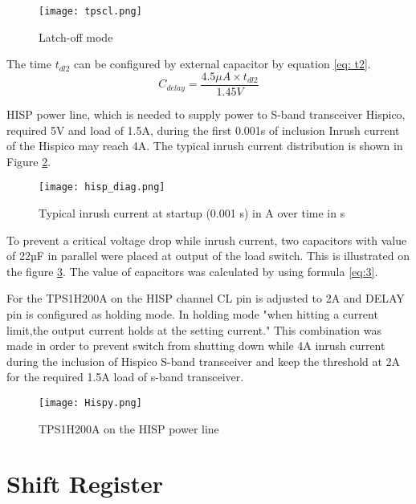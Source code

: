 \begin{figure}[h]
	\centering
	\texttt{[image: tpscl.png]}
	\caption{Latch-off mode\cite{28}}
	\label{fig: tpscl}
\end{figure} 

The time $t_{dl2}$ can be configured by external capacitor by equation \ref{eq: t2}.  \\

\begin{equation} \label{eq: t2}
C_{delay} = \frac{4.5\mu A \times t_{dl2}}{1.45V} 
\end{equation}



 HISP power line, which is needed to supply power to S-band transceiver Hispico, required 5V and load of 1.5A, during the first 0.001s of inclusion Inrush current of the Hispico may reach 4A. The typical inrush current distribution is shown in Figure \ref{fig: hisp_inr}.

\begin{figure}[h]
	\centering
	\texttt{[image: hisp\_diag.png]}
	\caption{Typical inrush current at startup (0.001 s) in A over time in s}
	\label{fig: hisp_inr}
\end{figure} 

To prevent a critical voltage drop while inrush current, two capacitors with value of 22µF in parallel were placed at output of the load switch. This is illustrated on the figure \ref{fig: hispico}. The value of capacitors was calculated by using formula \ref{eq:3}.

For the TPS1H200A on the HISP channel CL pin is adjusted to 2A and DELAY pin is configured as holding mode. In holding mode \cite{28}"when hitting a current limit,the output current holds at the setting current." This combination was made in order to prevent switch from shutting down while 4A inrush current during the inclusion of Hispico S-band transceiver and keep the threshold at 2A for the required 1.5A load of s-band transceiver. 
 


\begin{figure}[h]
	\centering
	\texttt{[image: Hispy.png]}
	\caption{TPS1H200A on the HISP power line}
	\label{fig: hispico}
\end{figure}



 
\section{Shift Register}\label{shiftty}

